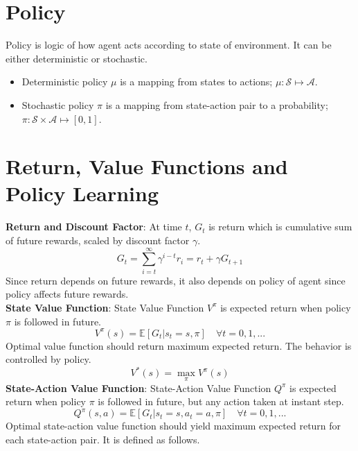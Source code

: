 \section{Policy}
Policy is logic of how agent acts according to state of environment. It can be either deterministic or stochastic. \\
\begin{itemize}
	\item Deterministic policy $\mu$ is a mapping from states to actions; $\mu \colon \mathcal{S} \mapsto \mathcal{A}$.
	\item Stochastic policy $\pi$ is a mapping from state-action pair to a probability; $\pi \colon \mathcal{S} \times \mathcal{A} \mapsto [0,1]$.
\end{itemize}
\section{Return, Value Functions and Policy Learning}
\textbf{Return and Discount Factor}: At time $t$, $G_t$ is return which is cumulative sum of future rewards, scaled by discount factor $\gamma$. \\
\begin{equation}
G_t = \sum_{i=t}^{\infty} \gamma^{i-t} r_i = r_t + \gamma G_{t+1}
\end{equation}
Since return depends on future rewards, it also depends on policy of agent since policy affects future rewards. \\
\textbf{State Value Function}: State Value Function $V^{\pi}$ is expected return when policy $\pi$ is followed in future. \\
\begin{equation}
V^{\pi}(s) = \mathbb{E}[G_t|s_t=s, \pi] \quad \forall t = 0,1, ...
\end{equation}
Optimal value function should return maximum expected return. The behavior is controlled by policy. \\
\begin{equation}
V^{*}(s) = \max_{\pi} V^{\pi}(s)
\end{equation}
\textbf{State-Action Value Function}: State-Action Value Function $Q^{\pi}$ is expected return when policy $\pi$ is followed in future, but any action taken at instant step. \\
\begin{equation}
Q^{\pi}(s,a) = \mathbb{E}[G_t|s_t=s, a_t=a, \pi] \quad \forall t = 0,1, ...
\end{equation}
Optimal state-action value function should yield maximum expected return for each state-action pair. It is defined as follows. \\
